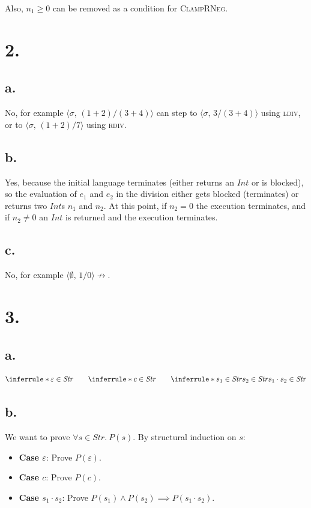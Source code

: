 \documentclass[11pt]{article}
\newcommand{\conf}[2]{\langle #1,\, #2\rangle}
\newcommand{\Str}{\mathit{Str}}
\begin{document}
\bigskip
\noindent Also, $n_1 \ge 0$ can be removed as a condition for \textsc{ClampRNeg}.

\section*{2.}

\subsection*{a.}
No, for example $\conf{\sigma}{(1+2)/(3+4)}$ can step to $\conf{\sigma}{3/(3+4)}$ using \textsc{ldiv}, or to $\conf{\sigma}{(1+2)/7}$ using \textsc{rdiv}.

\subsection*{b.}
Yes, because the initial language terminates (either returns an $\mathit{Int}$ or is blocked), so the evaluation of $e_1$ and $e_2$ in the division either gets blocked (terminates) or returns two $\mathit{Int}$s $n_1$ and $n_2$. At this point, if $n_2 = 0$ the execution terminates, and if $n_2 \ne 0$ an $\mathit{Int}$ is returned and the execution terminates.

\subsection*{c.}
No, for example $\conf{\emptyset}{1/0} \not\longrightarrow$.

\section*{3.}

\subsection*{a.}

\[
\inferrule*{ }{\varepsilon \in \Str} \qquad
\inferrule*{ }{c \in \Str} \qquad
\inferrule*{
  s_1 \in \Str \\ s_2 \in \Str
}{
  s_1 \cdot s_2 \in \Str
}
\]

\subsection*{b.}
We want to prove $\forall s \in \Str.\ P(s)$. By structural induction on $s$:

\begin{itemize}
\item \textbf{Case $\varepsilon$}: Prove $P(\varepsilon)$.
\item \textbf{Case $c$}: Prove $P(c)$.
\item \textbf{Case $s_1 \cdot s_2$}: Prove $P(s_1) \wedge P(s_2) \implies P(s_1 \cdot s_2)$.
\end{itemize}
\end{document}
